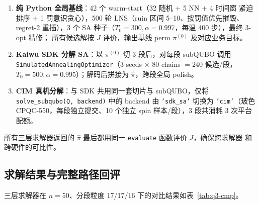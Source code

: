 \documentclass[UTF8,12pt,a4paper]{ctexart}
\begin{document}
\begin{enumerate}
  \item[(i)] \textbf{纯 Python 全局基线}：42 个 warm-start（32 随机 $+$ 5 NN $+$ 4 时间窗
    紧迫排序 $+$ 1 罚意识贪心），500 轮 LNS（ruin 区间 5--10、按罚值优先摧毁、regret-2
    重插），3 个 SA 种子（$T_0=300,\alpha=0.997$，每温 400 步），最终 3-opt 精修；
    所有候选解按 $J$ 评价，输出基线 perm $\pi^{(0)}$ 及对应业务目标。
  \item[(ii)] \textbf{Kaiwu SDK 分解 SA}：以 $\pi^{(0)}$ 切 3 段后，对每段 subQUBO 调用
    \texttt{SimulatedAnnealingOptimizer}（3 seeds $\times$ 80 chains $=240$ 候选/段，
    $T_0=500,\alpha=0.995$）；解码后拼接为 $\hat\pi$，跨段全局 polish。
  \item[(iii)] \textbf{CIM 真机分解}：与 SDK 共用同一套切片与 subQUBO，仅将
    \texttt{solve\_subqubo(Q, backend)} 中的 backend 由 \texttt{'sdk\_sa'} 切换为
    \texttt{'cim'}（玻色 CPQC-550，每段独立提交、10 个独立 spin 样本/段），3 段共消耗
    3 次平台配额。
\end{enumerate}
所有三层求解器返回的 $\hat\pi$ 最后都用同一 \texttt{evaluate} 函数评价 $J$，确保跨求解器
和跨硬件的可比性。

\subsection{求解结果与完整路径回评}
\label{subsec:q3-result}

三层求解器在 $n=50$、分段粒度 17/17/16 下的对比结果如表~\ref{tab:q3-cmp}。
\end{document}

